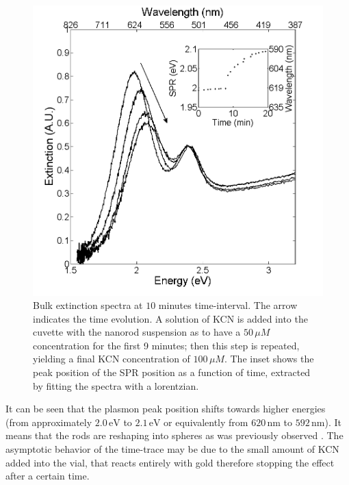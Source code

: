 \documentclass[twocolumn]{article}
\begin{document}
\begin{figure}[tp]
 \centering 
 \includegraphics[width=0.95\linewidth]{plasmon_bulk.png}
 \caption{Bulk extinction spectra at $10$ minutes time-interval. The arrow
 indicates the time evolution. A solution of KCN is added into the cuvette with
 the nanorod suspension as to have a $50\,\mu M$ concentration for the first 9
 minutes; then this step is repeated, yielding a final KCN concentration of
 $100\, \mu M$. The inset shows the peak position of the SPR position as a
 function of time, extracted by fitting the spectra with a lorentzian.  }
 \label{fig:bulk}
\end{figure}

It can be seen that the plasmon peak position shifts towards higher energies
(from approximately $2.0\,\textrm{eV}$ to $2.1\,\textrm{eV}$ or equivalently
from $620\,\textrm{nm}$ to $592\,\textrm{nm}$). It means that the rods are
reshaping into spheres as was previously observed \cite{Jana2002}. The
asymptotic behavior of the time-trace may be due to the small amount of KCN
added into the vial, that reacts entirely with gold therefore stopping the
effect after a certain time.
\end{document}
